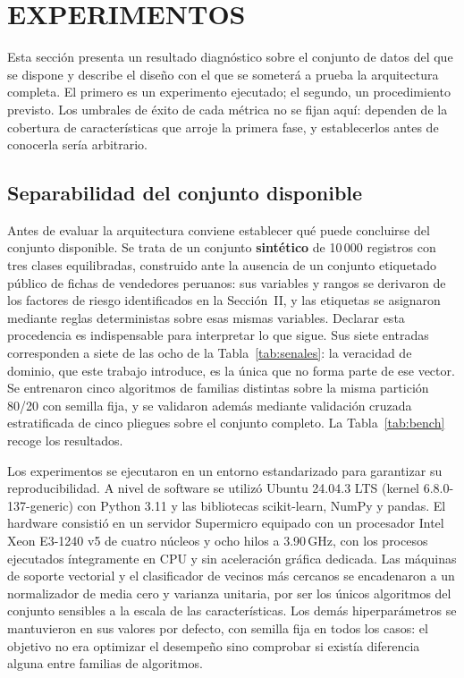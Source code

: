 
\section{EXPERIMENTOS}

Esta sección presenta un resultado diagnóstico sobre el conjunto de datos del que se
dispone y describe el diseño con el que se someterá a prueba la arquitectura completa. El
primero es un experimento ejecutado; el segundo, un procedimiento previsto. Los umbrales de
éxito de cada métrica no se fijan aquí: dependen de la cobertura de características que arroje
la primera fase, y establecerlos antes de conocerla sería arbitrario.

\subsection{Separabilidad del conjunto disponible}

Antes de evaluar la arquitectura conviene establecer qué puede concluirse del conjunto
disponible. Se trata de un conjunto \textbf{sintético} de 10\,000 registros con tres clases
equilibradas, construido ante la ausencia de un conjunto etiquetado público de fichas de
vendedores peruanos: sus variables y rangos se derivaron de los factores de riesgo
identificados en la Sección~II, y las etiquetas se asignaron mediante reglas deterministas
sobre esas mismas variables. Declarar esta procedencia es indispensable para interpretar lo
que sigue. Sus siete entradas
corresponden a siete de las ocho de la Tabla~\ref{tab:senales}: la veracidad de dominio, que
este trabajo introduce, es la única que no forma parte de ese vector. Se entrenaron cinco algoritmos de familias
distintas sobre la misma partición 80/20 con semilla fija, y se validaron además mediante
validación cruzada estratificada de cinco pliegues sobre el conjunto completo. La
Tabla~\ref{tab:bench} recoge los resultados.

Los experimentos se ejecutaron en un entorno estandarizado para garantizar su
reproducibilidad. A nivel de software se utilizó Ubuntu 24.04.3 LTS (kernel 6.8.0-137-generic)
con Python 3.11 y las bibliotecas scikit-learn, NumPy y pandas. El hardware consistió en un servidor
Supermicro equipado con un procesador Intel Xeon E3-1240 v5 de cuatro núcleos y ocho hilos a
3.90\,GHz, con los procesos ejecutados íntegramente en CPU y sin aceleración gráfica dedicada.
Las máquinas de soporte vectorial y el clasificador de vecinos más cercanos se encadenaron a
un normalizador de media cero y varianza unitaria, por ser los únicos algoritmos del conjunto
sensibles a la escala de las características. Los demás hiperparámetros se mantuvieron en sus
valores por defecto, con semilla fija en todos los casos: el objetivo no era optimizar el
desempeño sino comprobar si existía diferencia alguna entre familias de algoritmos.

